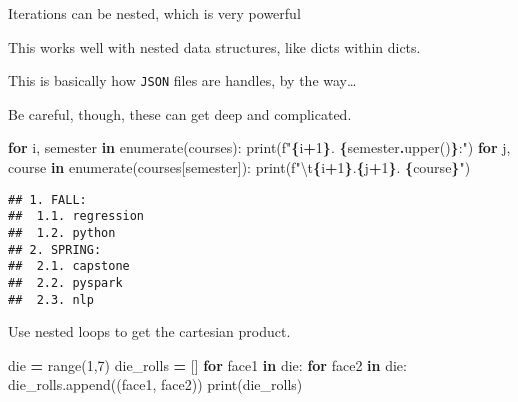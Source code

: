 \documentclass[
]{book}
\newenvironment{Shaded}{\begin{snugshade}}{\end{snugshade}}
\newcommand{\BuiltInTok}[1]{#1}
\newcommand{\CharTok}[1]{\textcolor[rgb]{0.31,0.60,0.02}{#1}}
\newcommand{\ControlFlowTok}[1]{\textcolor[rgb]{0.13,0.29,0.53}{\textbf{#1}}}
\newcommand{\DecValTok}[1]{\textcolor[rgb]{0.00,0.00,0.81}{#1}}
\newcommand{\KeywordTok}[1]{\textcolor[rgb]{0.13,0.29,0.53}{\textbf{#1}}}
\newcommand{\NormalTok}[1]{#1}
\newcommand{\OperatorTok}[1]{\textcolor[rgb]{0.81,0.36,0.00}{\textbf{#1}}}
\newcommand{\SpecialCharTok}[1]{\textcolor[rgb]{0.81,0.36,0.00}{\textbf{#1}}}
\newcommand{\SpecialStringTok}[1]{\textcolor[rgb]{0.31,0.60,0.02}{#1}}
\begin{document}
Iterations can be nested, which is very powerful

This works well with nested data structures, like dicts within dicts.

This is basically how \texttt{JSON} files are handles, by the way\ldots{}

Be careful, though, these can get deep and complicated.

\begin{Shaded}
\begin{Highlighting}[]
\ControlFlowTok{for}\NormalTok{ i, semester }\KeywordTok{in} \BuiltInTok{enumerate}\NormalTok{(courses):}
    \BuiltInTok{print}\NormalTok{(}\SpecialStringTok{f"}\SpecialCharTok{\{}\NormalTok{i}\OperatorTok{+}\DecValTok{1}\SpecialCharTok{\}}\SpecialStringTok{. }\SpecialCharTok{\{}\NormalTok{semester}\SpecialCharTok{.}\NormalTok{upper()}\SpecialCharTok{\}}\SpecialStringTok{:"}\NormalTok{)}
    \ControlFlowTok{for}\NormalTok{ j, course }\KeywordTok{in} \BuiltInTok{enumerate}\NormalTok{(courses[semester]):}
        \BuiltInTok{print}\NormalTok{(}\SpecialStringTok{f"}\CharTok{\textbackslash{}t}\SpecialCharTok{\{}\NormalTok{i}\OperatorTok{+}\DecValTok{1}\SpecialCharTok{\}}\SpecialStringTok{.}\SpecialCharTok{\{}\NormalTok{j}\OperatorTok{+}\DecValTok{1}\SpecialCharTok{\}}\SpecialStringTok{. }\SpecialCharTok{\{}\NormalTok{course}\SpecialCharTok{\}}\SpecialStringTok{"}\NormalTok{)}
\end{Highlighting}
\end{Shaded}

\begin{verbatim}
## 1. FALL:
##  1.1. regression
##  1.2. python
## 2. SPRING:
##  2.1. capstone
##  2.2. pyspark
##  2.3. nlp
\end{verbatim}

Use nested loops to get the cartesian product.

\begin{Shaded}
\begin{Highlighting}[]
\NormalTok{die }\OperatorTok{=} \BuiltInTok{range}\NormalTok{(}\DecValTok{1}\NormalTok{,}\DecValTok{7}\NormalTok{)}
\NormalTok{die\_rolls }\OperatorTok{=}\NormalTok{ []}
\ControlFlowTok{for}\NormalTok{ face1 }\KeywordTok{in}\NormalTok{ die:}
    \ControlFlowTok{for}\NormalTok{ face2 }\KeywordTok{in}\NormalTok{ die:}
\NormalTok{        die\_rolls.append((face1, face2))}
\BuiltInTok{print}\NormalTok{(die\_rolls)}
\end{Highlighting}
\end{Shaded}
\end{document}
